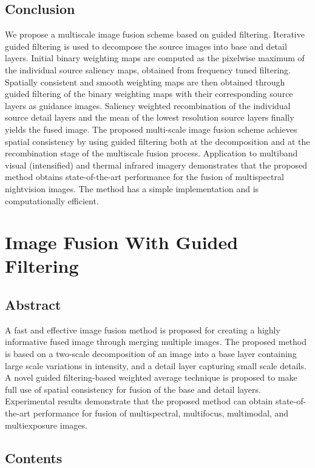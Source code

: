 \subsection{Conclusion}
We propose a multiscale image fusion scheme based on guided filtering. Iterative guided filtering is used to decompose the source images into base and detail layers. Initial binary weighting maps are computed as the pixelwise maximum of
the individual source saliency maps, obtained from frequency tuned filtering. Spatially consistent and smooth weighting maps are then obtained through guided filtering of the binary weighting maps with their corresponding source layers as
guidance images. Saliency weighted recombination of the individual source detail layers and the mean of the lowest resolution source layers finally yields the fused image. The proposed multi-scale image fusion scheme achieves spatial consistency by using guided filtering both at the decomposition and at the recombination stage of the multiscale fusion process. Application to multiband visual (intensified) and thermal infrared imagery demonstrates that the proposed method obtains state-of-the-art performance for the fusion of multispectral nightvision images. The method has a simple implementation and is computationally efficient.

\section{Image Fusion With Guided Filtering}
\subsection{Abstract}
A fast and effective image fusion method is proposed for creating a highly informative fused image through merging multiple images. The proposed method is based on a two-scale decomposition of an image into a base layer containing large scale variations in intensity, and a detail layer capturing small scale details. A novel guided filtering-based weighted average technique is proposed to make full use of spatial consistency for fusion of the base and detail layers. Experimental results
demonstrate that the proposed method can obtain state-of-the-art performance for fusion of multispectral, multifocus, multimodal, and multiexposure images.
\subsection{Contents}
